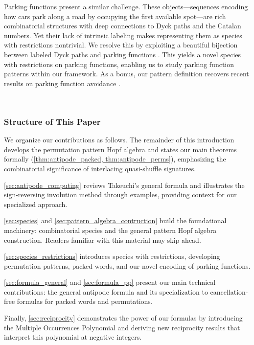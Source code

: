 \documentclass[12pt, reqno]{amsart}
\theoremstyle{definition}
\begin{document}
Parking functions present a similar challenge.
These objects---sequences encoding how cars park along a road by occupying the first available spot---are rich combinatorial structures with deep connections to Dyck paths and the Catalan numbers.
Yet their lack of intrinsic labeling makes representing them as species with restrictions nontrivial.
We resolve this by exploiting a beautiful bijection between labeled Dyck paths and parking functions \cite{Loehr,BGLPV2021}.
This yields a novel species with restrictions on parking functions, enabling us to study parking function patterns within our framework.
As a bonus, our pattern definition recovers recent results on parking function avoidance \cite{adeniran2022pattern}.

\

\subsubsection*{Structure of This Paper}

We organize our contributions as follows.
The remainder of this introduction develops the permutation pattern Hopf algebra and states our main theorems formally (\cref{thm:antipode_packed, thm:antipode_perms}), emphasizing the combinatorial significance of interlacing quasi-shuffle signatures.

\cref{sec:antipode_computing} reviews Takeuchi's general formula and illustrates the sign-reversing involution method through examples, providing context for our specialized approach.

\cref{sec:species} and \cref{sec:pattern_algebra_contruction} build the foundational machinery: combinatorial species and the general pattern Hopf algebra construction.
Readers familiar with this material may skip ahead.

\cref{sec:species_restrictions} introduces species with restrictions, developing permutation patterns, packed words, and our novel encoding of parking functions.

\cref{sec:formula_general} and \cref{sec:formula_pp} present our main technical contributions: the general antipode formula and its specialization to cancellation-free formulas for packed words and permutations.

Finally, \cref{sec:reciprocity} demonstrates the power of our formulas by introducing the Multiple Occurrences Polynomial and deriving new reciprocity results that interpret this polynomial at negative integers.
\end{document}
